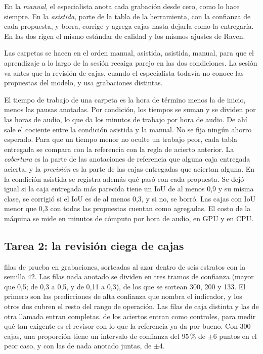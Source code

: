  En la \emph{manual}, el especialista anota cada grabación
desde cero, como lo hace siempre. En la \emph{asistida}, parte de la tabla de la
herramienta, con la confianza de cada propuesta, y borra, corrige y agrega cajas
hasta dejarla como la entregaría. En las dos rigen el mismo estándar de calidad y
los mismos ajustes de Raven.

 Las carpetas se hacen en el orden manual, asistida, asistida,
manual, para que el aprendizaje a lo largo de la sesión recaiga parejo en las dos
condiciones. La sesión va antes que la revisión de cajas, cuando el especialista
todavía no conoce las propuestas del modelo, y usa grabaciones distintas.

 El tiempo de trabajo de una carpeta es la hora de término menos
la de inicio, menos las pausas anotadas. Por condición, los tiempos se suman y se
dividen por las horas de audio, lo que da los minutos de trabajo por hora de
audio. De ahí sale el cociente entre la condición asistida y la manual. No se fija
ningún ahorro esperado. Para que un tiempo menor no oculte un trabajo peor, cada
tabla entregada se compara con la referencia con la regla de acierto anterior. La
\emph{cobertura} es la parte de las anotaciones de referencia que alguna caja
entregada acierta, y la \emph{precisión} es la parte de las cajas entregadas que
aciertan alguna. En la condición asistida se registra además qué pasó con cada
propuesta. Se dejó igual si la caja entregada más parecida tiene un IoU de al
menos 0,9 y su misma clase, se corrigió si el IoU es de al menos 0,3, y si no, se
borró. Las cajas con IoU menor que 0,3 con todas las propuestas cuentan como
agregadas. El costo de la máquina se mide en minutos de cómputo por hora de
audio, en GPU y en CPU.

\subsection{Tarea 2: la revisión ciega de cajas}
\label{sec:diseno-revision}

 \uItems{} filas de prueba en \uItemsRecordings{} grabaciones,
sorteadas al azar dentro de seis estratos con la semilla 42. Las \uNoneRows{}
filas nada anotado se dividen en tres tramos de confianza (mayor que 0,5; de 0,3 a
0,5, y de 0,11 a 0,3), de los que se sortean 300, 200 y 133. El primero son las
predicciones de alta confianza que nombra el indicador, y los otros dos cubren el
resto del rango de operación. Las \uBoxRows{} filas de caja distinta y las
\uLabelRows{} de otra llamada entran completas. \uControls{} de los \uMatchRows{}
aciertos entran como controles, para medir qué tan exigente es el revisor con lo
que la referencia ya da por bueno. Con 300 cajas, una proporción tiene un
intervalo de confianza del 95\,\% de $\pm$6 puntos en el peor caso, y con las
\uNoneSample{} de nada anotado juntas, de $\pm$4.


